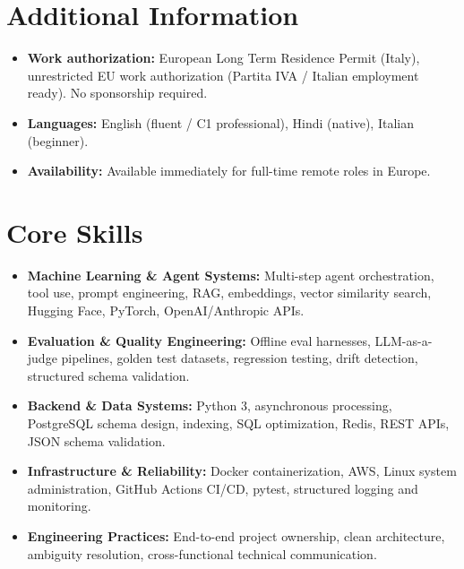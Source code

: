 \documentclass[a4paper,10pt]{article}
\begin{document}
\section{Additional Information}
\begin{itemize}
 \item \textbf{Work authorization:} European Long Term Residence Permit (Italy), unrestricted EU work authorization (Partita IVA / Italian employment ready). No sponsorship required.
 \item \textbf{Languages:} English (fluent / C1 professional), Hindi (native), Italian (beginner).
 \item \textbf{Availability:} Available immediately for full-time remote roles in Europe.
\end{itemize}

\section{Core Skills}
\begin{itemize}
 \item \textbf{Machine Learning \& Agent Systems:} Multi-step agent orchestration, tool use, prompt engineering, RAG, embeddings, vector similarity search, Hugging Face, PyTorch, OpenAI/Anthropic APIs.
 \item \textbf{Evaluation \& Quality Engineering:} Offline eval harnesses, LLM-as-a-judge pipelines, golden test datasets, regression testing, drift detection, structured schema validation.
 \item \textbf{Backend \& Data Systems:} Python 3, asynchronous processing, PostgreSQL schema design, indexing, SQL optimization, Redis, REST APIs, JSON schema validation.
 \item \textbf{Infrastructure \& Reliability:} Docker containerization, AWS, Linux system administration, GitHub Actions CI/CD, pytest, structured logging and monitoring.
 \item \textbf{Engineering Practices:} End-to-end project ownership, clean architecture, ambiguity resolution, cross-functional technical communication.
\end{itemize}
\end{document}
